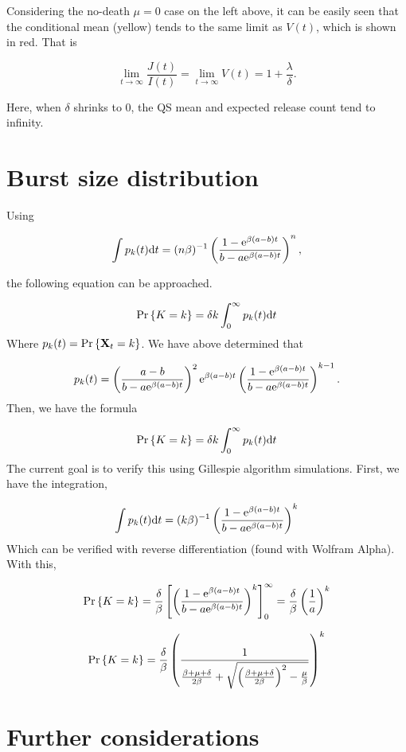 Considering the no-death $\mu = 0$ case on the left above,  it can be easily seen that the conditional mean (yellow) tends to the same limit as $V(t)$, which is shown in red.  That is 

$$\lim_{t\to\infty}     \frac{J(t)}{I(t)}     =    \lim_{t\to\infty} V(t)  = 1 + \frac{\lambda}{\delta}.$$

Here,  when $\delta$ shrinks to 0, the QS mean and expected release count tend to infinity.  








\section{Burst size distribution}

Using 

$$ \int p_k(t){\rm d} t  = (n\beta)^{-1} \left(\frac{{1-{\rm e}^{\beta(a-b)t}}}{{b - a{\rm e}^{\beta(a-b)t}} } \right)^{n},$$

the following equation can be approached. 


$${\text{Pr}\left\{K = k\right\}} = \delta k \int_0^\infty p_k(t){\rm d} t$$
Where $p_k(t) = {\text{Pr}\left\{{{\bf X}_t} = k\right\}}$. We have above determined that 

$$p_k(t) =\left( \frac{ a-b }{{b - a{\rm e}^{\beta(a-b)t}}}\right)^2 {\rm e}^{\beta(a-b)t} \left(\frac{{1-{\rm e}^{\beta(a-b)t}}}{{b - a{\rm e}^{\beta(a-b)t}} } \right)^{k-1}.$$
Then, we have the formula

$${\text{Pr}\left\{K = k\right\}} = \delta k \int_0^\infty p_k(t){\rm d} t$$
The current goal is to verify this using Gillespie algorithm simulations. First, we have the integration,

$$\int p_k(t){\rm d} t  = (k\beta)^{-1} \left(\frac{1 - {\rm e}^{\beta(a-b)t}}{b - a{\rm e}^{\beta(a-b)t}}\right)^k $$
Which can be verified with reverse differentiation (found with Wolfram Alpha). With this,

$${\text{Pr}\left\{K=k\right\}} = \frac{\delta}{\beta}\left[ \left(\frac{1 - {\rm e}^{\beta(a-b)t}}{b - a{\rm e}^{\beta(a-b)t}}\right)^k\right]^\infty_0 = \frac{\delta}{\beta}\left(\frac{1}{a}\right)^k$$

$${\text{Pr}\left\{K=k\right\}} = \frac{\delta}{\beta}\left(\frac{1}{\frac{\beta+\mu+\delta}{2\beta} + \sqrt{\left(\frac{\beta+\mu+\delta}{2\beta}\right)^2 - \frac{\mu}{\beta}}}\right)^k$$






\section{Further considerations}

